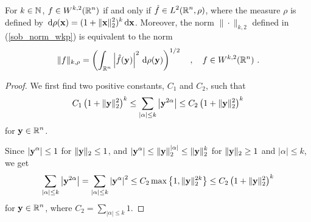 \begin{theorem} \label{sob_wk2_wk2}
For $k\in \mathbb{N}$, $\displaystyle f \in W^{k,2}(\mathbb{R}^n)$ if and only if
$\displaystyle \hat{f} \in L^2(\mathbb{R}^n,\rho)$, where the measure $\rho$
is defined by
$\displaystyle \,\mathrm{d}{\rho(\mathbf{x})} = (1+\|\mathbf{x}\|_2^2)^k\,\mathrm{d}{\mathbf{x}}$.
Moreover, the norm $\|\cdot \|_{k,2}$ defined in (\ref{sob_norm_wkp})
is equivalent to the norm
\begin{equation} \label{sob_norm_wkmu}
\|f \|_{k,\rho} = \left( \int_{\RR^n} \left| \hat{f}(\VEC{y})\right|^2
\dx{\rho(\VEC{y})} \right)^{1/2} \quad , \quad f \in W^{k,2}(\RR^n) \ .
\end{equation}
\end{theorem}

\begin{proof}
 We first find two positive constants,
$C_1$ and $C_2$, such that
\[
C_1 \left( 1 + \|\mathbf{y}\|_2^2\right)^k \leq
\sum_{|\alpha|\leq k} \left|\mathbf{y}^{2\alpha}\right| \leq
C_2 \left( 1 + \|\mathbf{y}\|_2^2\right)^k
\]
for $\displaystyle \mathbf{y} \in \mathbb{R}^n$.

 Since
$\displaystyle \left| \mathbf{y}^\alpha \right| \leq 1$
for $\|\mathbf{y}\|_2 \leq 1$, and
$\displaystyle \left| \mathbf{y}^\alpha \right| \leq
\|\mathbf{y}\|_2^{|\alpha|} \leq \|\mathbf{y}\|_2^{k}$
for $\|\mathbf{y}\|_2 \geq 1$ and $|\alpha|\leq k$, we get
\[
\sum_{|\alpha|\leq k} \left|\mathbf{y}^{2\alpha}\right| 
= \sum_{|\alpha|\leq k} \left|\mathbf{y}^{\alpha}\right|^2 \leq
C_2 \max\left\{ 1, \|\mathbf{y}\|_2^{2k} \right\}
\leq C_2 \left( 1 + \|\mathbf{y}\|_2^2\right)^k
\]
for $\displaystyle \mathbf{y} \in \mathbb{R}^n$, where
$\displaystyle C_2 = \sum_{|\alpha|\leq k} 1$.


\end{proof}
